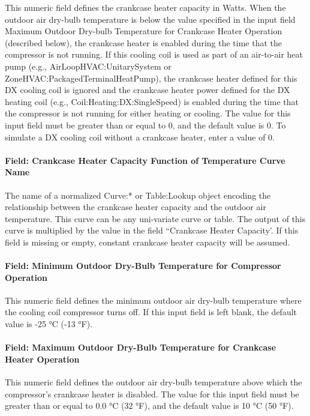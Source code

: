 This numeric field defines the crankcase heater capacity in Watts. When the outdoor air dry-bulb temperature is below the value specified in the input field Maximum Outdoor Dry-bulb Temperature for Crankcase Heater Operation (described below), the crankcase heater is enabled during the time that the compressor is not running. If this cooling coil is used as part of an air-to-air heat pump (e.g., AirLoopHVAC:UnitarySystem or ZoneHVAC:PackagedTerminalHeatPump), the crankcase heater defined for this DX cooling coil is ignored and the crankcase heater power defined for the DX heating coil (e.g., Coil:Heating:DX:SingleSpeed) is enabled during the time that the compressor is not running for either heating or cooling. The value for this input field must be greater than or equal to 0, and the default value is 0. To simulate a DX cooling coil without a crankcase heater, enter a value of 0.

\paragraph{Field: Crankcase Heater Capacity Function of Temperature Curve Name}

The name of a normalized Curve:* or Table:Lookup object encoding the relationship between the crankcase heater capacity and the outdoor air temperature. This curve can be any uni-variate curve or table. The output of this curve is multiplied by the value in the field ``Crankcase Heater Capacity'. If this field is missing or empty, constant crankcase heater capacity will be
assumed.

\paragraph{Field: Minimum Outdoor Dry-Bulb Temperature for Compressor Operation}

This numeric field defines the minimum outdoor air dry-bulb temperature where the cooling coil compressor turns off. If this input field is left blank, the default value is -25 °C (-13 °F).

\paragraph{Field: Maximum Outdoor Dry-Bulb Temperature for Crankcase Heater Operation}

This numeric field defines the outdoor air dry-bulb temperature above which the compressor's crankcase heater is disabled. The value for this input field must be greater than or equal to 0.0 °C (32 °F), and the default value is 10 °C (50 °F).

